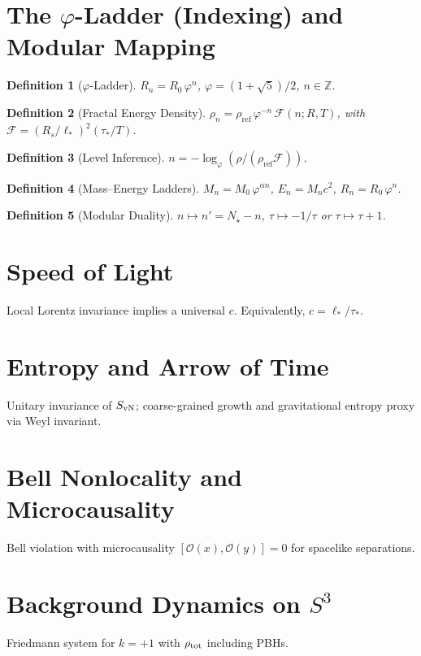 \documentclass[aps,prd,reprint,onecolumn,nofootinbib]{revtex4-2}
\newtheorem{definition}{Definition}
\begin{document}
\section{The $\varphi$-Ladder (Indexing) and Modular Mapping}
\begin{definition}[$\varphi$-Ladder]
$R_n = R_0\,\varphi^{n}$, $\varphi=(1+\sqrt5)/2$, $n\in\mathbb Z$.
\end{definition}
\begin{definition}[Fractal Energy Density]
$\rho_n = \rho_{\mathrm{ref}}\,\varphi^{-n}\,\mathcal F(n;R,T)$, with $\mathcal F = (R_s/\ell_*)^2(\tau_*/T)$.
\end{definition}
\begin{definition}[Level Inference]
$n = -\log_{\varphi}\!\left(\rho/(\rho_{\mathrm{ref}}\mathcal F)\right)$.
\end{definition}
\begin{definition}[Mass--Energy Ladders]
$M_n = M_0\,\varphi^{\alpha n}$, $E_n = M_n c^2$, $R_n=R_0\,\varphi^{n}$.
\end{definition}
\begin{definition}[Modular Duality]
$n \mapsto n' = N_\star - n$, $\tau \mapsto -1/\tau$ or $\tau\mapsto \tau+1$.
\end{definition}

\section{Speed of Light}
Local Lorentz invariance implies a universal $c$. Equivalently, $c=\ell_*/\tau_*$.

\section{Entropy and Arrow of Time}
Unitary invariance of $S_{\rm vN}$; coarse-grained growth and gravitational entropy proxy via Weyl invariant.

\section{Bell Nonlocality and Microcausality}
Bell violation with microcausality $[\mathcal O(x),\mathcal O(y)]=0$ for spacelike separations.

\section{Background Dynamics on $S^3$}
Friedmann system for $k=+1$ with $\rho_{\rm tot}$ including PBHs.
\end{document}
